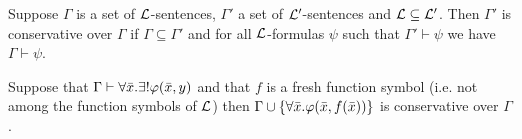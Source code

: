 \begin{boxdef}
\begin{defi}
    Suppose $\Gamma$ is a set of $\mathcal{L}$-sentences, $\Gamma'$ a set of $\mathcal{L}'$-sentences and $\mathcal{L} \subseteq \mathcal{L}'$.
    Then \alert{$\Gamma'$ is conservative over $\Gamma$} if $\Gamma \subseteq \Gamma'$ and for all $\mathcal{L}$-formulas $\psi$ such that $\Gamma' \vdash \psi$ we have $\Gamma \vdash \psi$. 
\end{defi}
\end{boxdef}

\begin{boxthm}
    Suppose that $\Gamma \vdash \forall \bar{x}. \exists! \varphi(\bar{x}, y)$ and that $f$ is a fresh function symbol (i.e. not among the function symbols of $\mathcal{L}$) then $\Gamma \cup \{\forall \bar{x}. \varphi(\bar{x}, f(\bar{x}))\}$ is conservative over $\Gamma$.
\end{boxthm}

